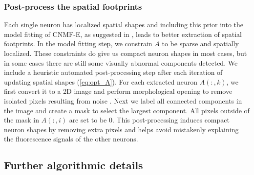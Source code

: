 \documentclass[9pt,lineno]{elife}
\begin{document}
\subsubsection{Post-process the spatial footprints}
Each single neuron has localized spatial shapes and including this prior into the model fitting of CNMF-E, as suggested in \citep{Pnevmatikakis2016},  leads to better extraction of spatial footprints. In the model fitting step, we constrain $A$ to be sparse and spatially localized. These constraints do give us compact neuron shapes in most cases, but in some cases there are still some visually abnormal components detected. We include a heuristic automated post-processing step  after each iteration of updating spatial shapes (\ref{eq:opt_A}). For each extracted neuron $A(:, k)$, we first convert it to a 2D image and perform morphological opening to remove isolated pixels resulting from noise \citep{Haralick1987}. Next we label all connected components in the image and create a mask to select the largest component. All pixels outside of the mask in $A(:, i)$ are set to be $0$. This post-processing induces compact neuron shapes by removing extra pixels and helps avoid mistakenly explaining the fluorescence signals of the other neurons. 

\subsection{Further algorithmic details}


\label{sec:pipeline}
\end{document}
